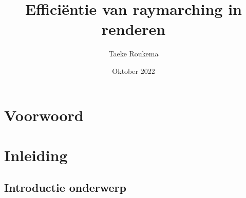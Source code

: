 \documentclass[12pt, a4paper]{article}
\title{Efficiëntie van raymarching in renderen}
\author{Taeke Roukema}
\date{Oktober 2022}
\begin{document}
\maketitle
\begin{abstract}
\end{abstract}
\clearpage
\tableofcontents{}
\clearpage
\section{Voorwoord}
\clearpage
\section{Inleiding}
\subsection{Introductie onderwerp}
\end{document}
